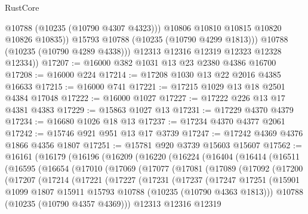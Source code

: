 \begin{lexlean}{RustCore}
\begin{coremodule}
                  @10788
                  (@10235 (@10790 @4307 @4323)))
                @10806
                @10810
                @10815
                @10820
                @10826
                @10835))
            @15793
            @10788
            (@10235 (@10790 @4299 @1813)))
          @10788
          (@10235 (@10790 @4289 @4338)))
        @12313
        @12316
        @12319
        @12323
        @12328
        @12334))
@17207 := @16000 @382 @1031 @13 @23 @2380 @4386 @16700
@17208 := @16000 @224
@17214 := @17208 @1030 @13 @22 @2016 @4385 @16633
@17215 := @16000 @741
@17221 := @17215 @1029 @13 @18 @2501 @4384 @17048
@17222 := @16000 @1027
@17227 := @17222 @226 @13 @17 @4381 @4383
@17229 := @15863 @1027 @13
@17231 := @17229 @4370 @4379
@17234 := @16680 @1026 @18 @13
@17237 := @17234 @4370 @4377 @2061
@17242 := @15746 @921 @951 @13 @17 @3739
@17247 := @17242 @4369 @4376 @1866 @4356 @1807
@17251 := @15781 @920 @3739 @15603 @15607
@17562 := @16161
    (@16179
      (@16196
        (@16209
          (@16220
            (@16224
              (@16404
                (@16414
                  (@16511
                    (@16595
                      (@16654
                        (@17010
                          (@17069
                            (@17077
                              (@17081
                                (@17089
                                  (@17092
                                    (@17200
                                      (@17207
                                        (@17214
                                          (@17221
                                            (@17227
                                              (@17231
                                                (@17237
                                                  (@17247
                                                    @17251
                                                    (@15901
                                                      @1099
                                                      @1807
                                                      @15911
                                                      @15793
                                                      @10788
                                                      (@10235 (@10790 @4363 @1813)))
                                                    @10788
                                                    (@10235 (@10790 @4357 @4369)))
                                                  @12313
                                                  @12316
                                                  @12319

\end{coremodule}
\end{lexlean}
